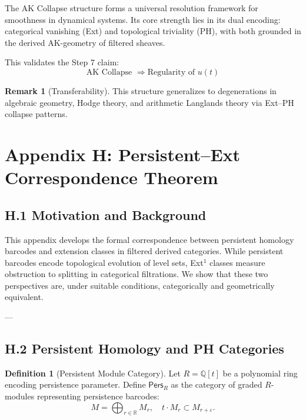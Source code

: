 \documentclass[11pt]{article}
\theoremstyle{definition}
\newtheorem{definition}[theorem]{Definition}
\newtheorem{remark}[theorem]{Remark}
\begin{document}
The AK Collapse structure forms a universal resolution framework for smoothness in dynamical systems.  
Its core strength lies in its dual encoding: categorical vanishing (Ext) and topological triviality (PH),  
with both grounded in the derived AK-geometry of filtered sheaves.

This validates the Step 7 claim:
\[
\text{AK Collapse } \Longrightarrow \text{Regularity of } u(t)
\]

\begin{remark}[Transferability]
This structure generalizes to degenerations in algebraic geometry, Hodge theory, and arithmetic Langlands theory via Ext–PH collapse patterns.
\end{remark}



\section*{Appendix H: Persistent–Ext Correspondence Theorem}

\subsection*{H.1 Motivation and Background}

This appendix develops the formal correspondence between persistent homology barcodes and extension classes in filtered derived categories.  
While persistent barcodes encode topological evolution of level sets, Ext$^1$ classes measure obstruction to splitting in categorical filtrations.  
We show that these two perspectives are, under suitable conditions, categorically and geometrically equivalent.

---

\subsection*{H.2 Persistent Homology and PH Categories}

\begin{definition}[Persistent Module Category]
Let $R = \mathbb{Q}[t]$ be a polynomial ring encoding persistence parameter.  
Define $\mathsf{Pers}_R$ as the category of graded $R$-modules representing persistence barcodes:
\[
M = \bigoplus_{r \in \mathbb{R}} M_r, \quad t \cdot M_r \subset M_{r+\varepsilon}.
\]
\end{definition}
\end{document}
